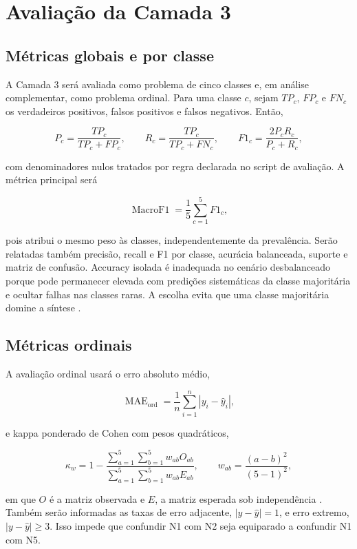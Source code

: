 \section{Avaliação da Camada 3}
\label{sec:avaliacao-c3}

\subsection{Métricas globais e por classe}

A Camada 3 será avaliada como problema de cinco classes e, em análise complementar, como problema ordinal. Para uma classe \(c\), sejam \(TP_c\), \(FP_c\) e \(FN_c\) os verdadeiros positivos, falsos positivos e falsos negativos. Então,

\[
P_c=\frac{TP_c}{TP_c+FP_c},\qquad
R_c=\frac{TP_c}{TP_c+FN_c},\qquad
F1_c=\frac{2P_cR_c}{P_c+R_c},
\]

com denominadores nulos tratados por regra declarada no script de avaliação. A métrica principal será

\[
\operatorname{MacroF1}=\frac{1}{5}\sum_{c=1}^{5}F1_c,
\]

pois atribui o mesmo peso às classes, independentemente da prevalência. Serão relatadas também precisão, recall e F1 por classe, acurácia balanceada, suporte e matriz de confusão. Accuracy isolada é inadequada no cenário desbalanceado porque pode permanecer elevada com predições sistemáticas da classe majoritária e ocultar falhas nas classes raras. A escolha evita que uma classe majoritária domine a síntese \cite{sokolovalapalme2009}.

\subsection{Métricas ordinais}

A avaliação ordinal usará o erro absoluto médio,

\[
\operatorname{MAE}_{\mathrm{ord}}
=\frac{1}{n}\sum_{i=1}^{n}|y_i-\widehat{y}_i|,
\]

e kappa ponderado de Cohen com pesos quadráticos,

\[
\kappa_w=1-\frac{\sum_{a=1}^{5}\sum_{b=1}^{5}w_{ab}O_{ab}}
{\sum_{a=1}^{5}\sum_{b=1}^{5}w_{ab}E_{ab}},
\qquad
w_{ab}=\frac{(a-b)^2}{(5-1)^2},
\]

em que \(O\) é a matriz observada e \(E\), a matriz esperada sob independência \cite{cohen1968}. Também serão informadas as taxas de erro adjacente, \(|y-\widehat y|=1\), e erro extremo, \(|y-\widehat y|\geq 3\). Isso impede que confundir N1 com N2 seja equiparado a confundir N1 com N5.

